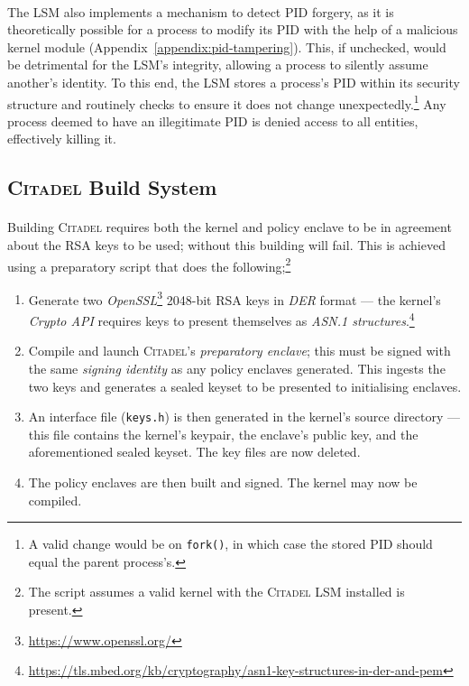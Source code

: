 \paragraph{} The LSM also implements a mechanism to detect PID forgery, as it is theoretically possible for a process to modify its PID with the help of a malicious kernel module (Appendix~\ref{appendix:pid-tampering}). This, if unchecked, would be detrimental for the LSM's integrity, allowing a process to silently assume another's identity. To this end, the LSM stores a process's PID within its security structure and routinely checks to ensure it does not change unexpectedly.\footnote{A valid change would be on \texttt{fork()}, in which case the stored PID should equal the parent process's.} Any process deemed to have an illegitimate PID is denied access to all entities, effectively killing it.

\subsection{\textsc{Citadel} Build System}
\label{sec:build-system}
\paragraph{} Building \textsc{Citadel} requires both the kernel and policy enclave to be in agreement about the RSA keys to be used; without this building will fail. This is achieved using a preparatory script that does the following;\footnote{The script assumes a valid kernel with the \textsc{Citadel} LSM installed is present.}

\begin{enumerate}
    \item Generate two \textit{OpenSSL}\footnote{\url{https://www.openssl.org/}} 2048-bit RSA keys in \textit{DER} format --- the kernel's \textit{Crypto API} requires keys to present themselves as \textit{ASN.1 structures}.\footnote{\url{https://tls.mbed.org/kb/cryptography/asn1-key-structures-in-der-and-pem}}
    \item Compile and launch \textsc{Citadel}'s \textit{preparatory enclave}; this must be signed with the same \textit{signing identity} as any policy enclaves generated. This ingests the two keys and generates a sealed keyset to be presented to initialising enclaves.
    \item An interface file (\texttt{keys.h}) is then generated in the kernel's source directory --- this file contains the kernel's keypair, the enclave's public key, and the aforementioned sealed keyset. The key files are now deleted.
    \item The policy enclaves are then built and signed. The kernel may now be compiled.
\end{enumerate}

